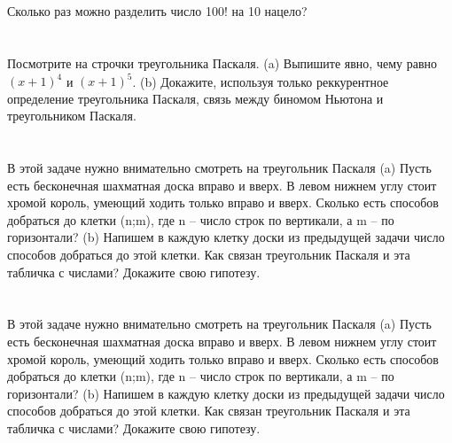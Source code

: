 \documentclass{article}%
\begin{document}
%
\section{}%
\label{sec:}%
Сколько раз можно разделить число 100! на 10 нацело?%
%
\iffalse%
Автор: Дарья Анзон%
Дата: 01{-}07{-}2017%
Название: None%
Подсказка: \textbackslash{}\textbackslash{}%
nan%
\fi

%
\section{}%
\label{sec:}%
Посмотрите на строчки треугольника Паскаля.
(a) Выпишите явно, чему равно $(x + 1)^4$ и $(x + 1)^5$.
(b) Докажите, используя только реккурентное определение треугольника Паскаля, связь между биномом Ньютона и треугольником Паскаля.%
%
\iffalse%
Автор: Павел Минаев%
Дата: 07{-}10{-}2017%
Название: None%
Подсказка: \textbackslash{}\textbackslash{}%
nan%
\fi

%
\section{}%
\label{sec:}%
В этой задаче нужно внимательно смотреть на треугольник Паскаля
(a) Пусть есть бесконечная шахматная доска вправо и вверх. В левом нижнем углу стоит хромой король,
умеющий ходить только вправо и вверх. Сколько есть способов добраться до клетки (n;m), где n – число
строк по вертикали, а m – по горизонтали?
(b) Напишем в каждую клетку доски из предыдущей задачи число способов добраться до этой клетки. Как
связан треугольник Паскаля и эта табличка с числами? Докажите свою гипотезу.%
%
\iffalse%
Автор: Павел Минаев%
Дата: 07{-}10{-}2017%
Название: None%
Подсказка: \textbackslash{}\textbackslash{}%
nan%
\fi

%
\section{}%
\label{sec:}%
В этой задаче нужно внимательно смотреть на треугольник Паскаля
(a) Пусть есть бесконечная шахматная доска вправо и вверх. В левом нижнем углу стоит хромой король,
умеющий ходить только вправо и вверх. Сколько есть способов добраться до клетки (n;m), где n – число
строк по вертикали, а m – по горизонтали?
(b) Напишем в каждую клетку доски из предыдущей задачи число способов добраться до этой клетки. Как
связан треугольник Паскаля и эта табличка с числами? Докажите свою гипотезу.%
%
\iffalse%
Автор: Павел Минаев%
Дата: 07{-}10{-}2017%
Название: None%
Подсказка: \textbackslash{}\textbackslash{}%
nan%
\fi
\end{document}
